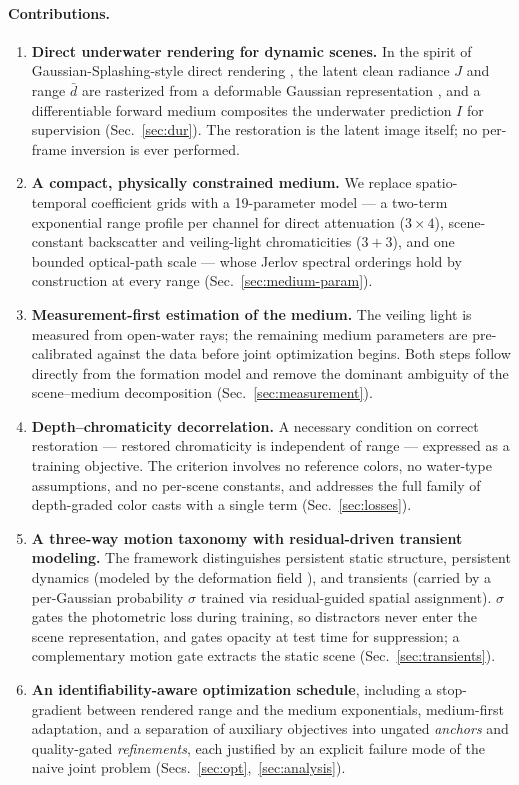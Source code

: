 \documentclass[11pt,a4paper]{article}
\newcommand{\J}{J}
\newcommand{\I}{I}
\begin{document}
\paragraph{Contributions.}
\begin{enumerate}[leftmargin=1.2cm,itemsep=2pt]
    \item \textbf{Direct underwater rendering for dynamic scenes.} In the spirit of Gaussian-Splashing-style direct rendering \cite{mualem2024gaussiansplashing}, the latent clean radiance $\J$ and range $\bar d$ are rasterized from a deformable Gaussian representation \cite{wu20244d}, and a differentiable forward medium composites the underwater prediction $\I$ for supervision (Sec.~\ref{sec:dur}). The restoration is the latent image itself; no per-frame inversion is ever performed.
    \item \textbf{A compact, physically constrained medium.} We replace spatio-temporal coefficient grids with a 19-parameter model --- a two-term exponential range profile per channel for direct attenuation ($3{\times}4$), scene-constant backscatter and veiling-light chromaticities ($3{+}3$), and one bounded optical-path scale --- whose Jerlov spectral orderings \cite{jerlov1976marine} hold by construction at every range (Sec.~\ref{sec:medium-param}).
    \item \textbf{Measurement-first estimation of the medium.} The veiling light is measured from open-water rays; the remaining medium parameters are pre-calibrated against the data before joint optimization begins. Both steps follow directly from the formation model and remove the dominant ambiguity of the scene--medium decomposition (Sec.~\ref{sec:measurement}).
    \item \textbf{Depth--chromaticity decorrelation.} A necessary condition on correct restoration --- restored chromaticity is independent of range --- expressed as a training objective. The criterion involves no reference colors, no water-type assumptions, and no per-scene constants, and addresses the full family of depth-graded color casts \cite{akkaynak2019sea,levy2023seathru} with a single term (Sec.~\ref{sec:losses}).
    \item \textbf{A three-way motion taxonomy with residual-driven transient modeling.} The framework distinguishes persistent static structure, persistent dynamics (modeled by the deformation field \cite{pumarola2021d,wu20244d}), and transients (carried by a per-Gaussian probability $\sigma$ trained via residual-guided spatial assignment). $\sigma$ gates the photometric loss during training, so distractors never enter the scene representation, and gates opacity at test time for suppression; a complementary motion gate extracts the static scene (Sec.~\ref{sec:transients}).
    \item \textbf{An identifiability-aware optimization schedule}, including a stop-gradient between rendered range and the medium exponentials, medium-first adaptation, and a separation of auxiliary objectives into ungated \emph{anchors} and quality-gated \emph{refinements}, each justified by an explicit failure mode of the naive joint problem (Secs.~\ref{sec:opt},~\ref{sec:analysis}).
\end{enumerate}
\end{document}
